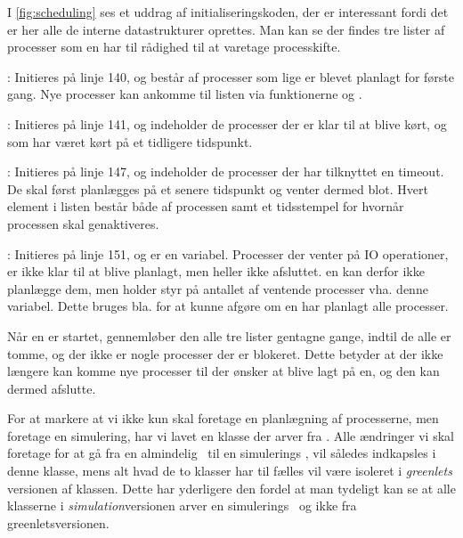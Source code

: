  I \cref{fig:scheduling} ses et uddrag af initialiseringskoden, der er interessant fordi det er her alle de interne datastrukturer oprettes. Man kan se der findes tre lister af processer som \sched en har til rådighed til at varetage processkifte. 
 \begin{list}
 \tightlist 
 \item {}: Initieres på linje 140, og består af processer som lige er blevet planlagt for første gang. Nye processer kan ankomme til listen  via funktionerne  og .
 \item {}: Initieres på linje 141, og indeholder de processer der er klar til at blive kørt, og som har været kørt på et tidligere tidspunkt.  
 \item {}: Initieres på linje 147, og indeholder de processer der har tilknyttet en timeout. De skal først planlægges på et senere tidspunkt og venter dermed blot. Hvert element i listen består både af processen samt et tidsstempel for hvornår processen skal genaktiveres. 
 \item {}: Initieres på linje 151, og er en variabel. Processer der venter på IO operationer, er ikke klar til at blive planlagt, men heller ikke afsluttet. \Sched en kan derfor ikke planlægge dem, men holder styr på antallet af ventende processer vha. denne variabel. Dette bruges bla. for at kunne afgøre om \sched en har planlagt alle processer.
\end{list}

Når \sched en er startet, gennemløber den alle tre lister gentagne gange, indtil de alle er tomme, og der ikke er nogle processer der er blokeret. Dette betyder at der ikke længere kan komme nye processer til der ønsker at blive lagt på \sched en, og den kan dermed afslutte.
\begin{shaded}
For at markere at vi ikke kun skal foretage en planlægning
af processerne, men foretage en simulering, har vi lavet en
 klasse der arver fra . Alle ændringer
vi skal foretage for at gå fra en almindelig \sched ~til en simulerings
\sched, vil således indkapsles i denne klasse, mens alt hvad de to
klasser har til fælles vil være isoleret i \emph{greenlets} versionen af
 klassen. Dette har yderligere den fordel at man tydeligt kan se
at alle klasserne i \emph{simulation}versionen arver en simulerings \sched ~og
ikke  fra greenletsversionen.
\end{shaded}

